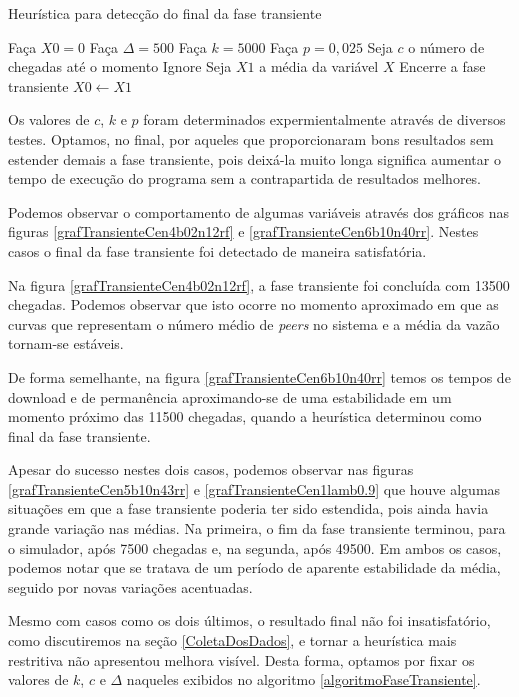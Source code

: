 \documentclass[a4paper,10pt]{article}
\begin{document}
\begin{algorithm}[H]
	\caption{Heurística para detecção do final da fase transiente}
	\label{algoritmoFaseTransiente}
	\begin{algorithmic}
		\STATE Faça $X0 = 0$
		\STATE Faça $\Delta = 500$
		\STATE Faça $k = 5000$
		\STATE Faça $p = 0,025$
		\STATE Seja $c$ o número de chegadas até o momento
				\STATE Ignore
				\STATE Seja $X1$ a média da variável $X$
					\STATE Encerre a fase transiente
				\ELSE
					\STATE $X0 \leftarrow X1$
				\ENDIF
			\ENDIF
		\ENDFOR
	\end{algorithmic}
\end{algorithm}

Os valores de $c$, $k$ e $p$ foram determinados expermientalmente através de diversos testes. Optamos, no final, por aqueles que proporcionaram bons resultados sem estender demais a fase transiente, pois deixá-la muito longa significa aumentar o tempo de execução do programa sem a contrapartida de resultados melhores.

Podemos observar o comportamento de algumas variáveis através dos gráficos nas figuras \ref{grafTransienteCen4b02n12rf} e \ref{grafTransienteCen6b10n40rr}. Nestes casos o final da fase transiente foi detectado de maneira satisfatória.

Na figura \ref{grafTransienteCen4b02n12rf}, a fase transiente foi concluída com 13500 chegadas. Podemos observar que isto ocorre no momento aproximado em que as curvas que representam o número médio de \textit{peers} no sistema e a média da vazão tornam-se estáveis.

De forma semelhante, na figura \ref{grafTransienteCen6b10n40rr} temos os tempos de download e de permanência aproximando-se de uma estabilidade em um momento próximo das 11500 chegadas, quando a heurística determinou como final da fase transiente.

Apesar do sucesso nestes dois casos, podemos observar nas figuras \ref{grafTransienteCen5b10n43rr} e \ref{grafTransienteCen1lamb0.9} que houve algumas situações em que a fase transiente poderia ter sido estendida, pois ainda havia grande variação nas médias. Na primeira, o fim da fase transiente terminou, para o simulador, após 7500 chegadas e, na segunda, após 49500. Em ambos os casos, podemos notar que se tratava de um período de aparente estabilidade da média, seguido por novas variações acentuadas.

Mesmo com casos como os dois últimos, o resultado final não foi insatisfatório, como discutiremos na seção \ref{ColetaDosDados}, e tornar a heurística mais restritiva não apresentou melhora visível. Desta forma, optamos por fixar os valores de $k$, $c$ e $\Delta$ naqueles exibidos no algoritmo \ref{algoritmoFaseTransiente}.
\end{document}
